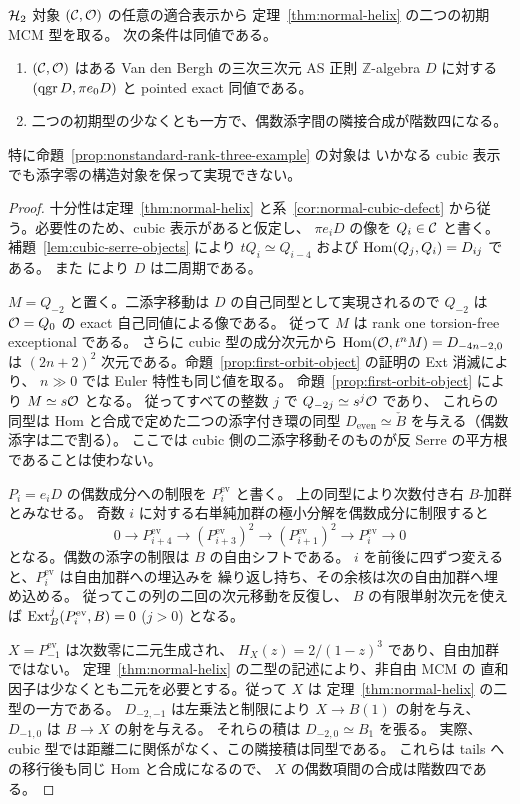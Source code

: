 \begin{theorem}
\label{thm:cubic-coverage}
$\mathcal H_2$ 対象 $(\mathcal C,\mathcal O)$ の任意の適合表示から
定理~\ref{thm:normal-helix} の二つの初期 MCM 型を取る。
次の条件は同値である。
\begin{enumerate}
\item $(\mathcal C,\mathcal O)$ はある Van den Bergh の三次三次元 AS 正則
$\mathbb Z$-algebra $D$ に対する $(\operatorname{qgr} D,\pi e_0D)$ と pointed exact 同値である。
\item 二つの初期型の少なくとも一方で、偶数添字間の隣接合成が階数四になる。
\end{enumerate}
特に命題~\ref{prop:nonstandard-rank-three-example} の対象は
いかなる cubic 表示でも添字零の構造対象を保って実現できない。
\end{theorem}

\begin{proof}
十分性は定理~\ref{thm:normal-helix} と系~\ref{cor:normal-cubic-defect}
から従う。必要性のため、cubic 表示があると仮定し、
$\pi e_iD$ の像を $Q_i\in\mathcal C$ と書く。
補題~\ref{lem:cubic-serre-objects} により
$tQ_i\simeq Q_{i-4}$ および $\operatorname{Hom}(Q_j,Q_i)=D_{ij}$ である。
また \cite[arXiv v3, Proposition 5.6.1]{VdB2011} により
$D$ は二周期である。

$M=Q_{-2}$ と置く。二添字移動は $D$ の自己同型として実現されるので
$Q_{-2}$ は $\mathcal O=Q_0$ の exact 自己同値による像である。
従って $M$ は rank one torsion-free exceptional である。
さらに cubic 型の成分次元から
$\operatorname{Hom}(\mathcal O,t^nM)=D_{-4n-2,0}$ は $(2n+2)^2$ 次元である。命題~\ref{prop:first-orbit-object} の証明の Ext 消滅により、
$n\gg0$ では Euler 特性も同じ値を取る。
命題~\ref{prop:first-orbit-object} により $M\simeq s\mathcal O$ となる。
従ってすべての整数 $j$ で $Q_{-2j}\simeq s^j\mathcal O$ であり、
これらの同型は Hom と合成で定めた二つの添字付き環の同型
$D_{\mathrm{even}}\simeq\check B$ を与える（偶数添字は二で割る）。
ここでは cubic 側の二添字移動そのものが反 Serre の平方根であることは使わない。

$P_i=e_iD$ の偶数成分への制限を $P_i^{\mathrm{ev}}$ と書く。
上の同型により次数付き右 $B$-加群とみなせる。
奇数 $i$ に対する右単純加群の極小分解を偶数成分に制限すると
\[
 0\longrightarrow P_{i+4}^{\mathrm{ev}}
 \longrightarrow (P_{i+3}^{\mathrm{ev}})^2
 \longrightarrow (P_{i+1}^{\mathrm{ev}})^2
 \longrightarrow P_i^{\mathrm{ev}}\longrightarrow0
\]
となる。偶数の添字の制限は $B$ の自由シフトである。
$i$ を前後に四ずつ変えると、$P_i^{\mathrm{ev}}$ は自由加群への埋込みを
繰り返し持ち、その余核は次の自由加群へ埋め込める。
従ってこの列の二回の次元移動を反復し、
$B$ の有限単射次元を使えば $\operatorname{Ext}_B^j(P_i^{\mathrm{ev}},B)=0$ ($j>0$) となる。

$X=P_{-1}^{\mathrm{ev}}$ は次数零に二元生成され、
$H_X(z)=2/(1-z)^3$ であり、自由加群ではない。
定理~\ref{thm:normal-helix} の二型の記述により、非自由 MCM の
直和因子は少なくとも二元を必要とする。従って $X$ は
定理~\ref{thm:normal-helix} の二型の一方である。
$D_{-2,-1}$ は左乗法と制限により $X\to B(1)$ の射を与え、
$D_{-1,0}$ は $B\to X$ の射を与える。
それらの積は $D_{-2,0}\simeq B_1$ を張る。
実際、cubic 型では距離二に関係がなく、この隣接積は同型である。
これらは tails への移行後も同じ Hom と合成になるので、
$X$ の偶数項間の合成は階数四である。
\end{proof}
